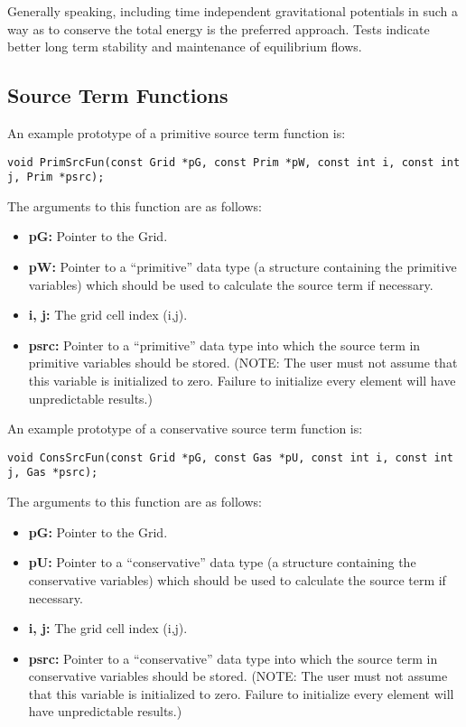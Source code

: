 Generally speaking, including time independent gravitational
potentials in such a way as to conserve the total energy is the
preferred approach.  Tests indicate better long term stability and
maintenance of equilibrium flows.

\subsection{Source Term Functions}

An example prototype of a primitive source term function is:
\footnotesize
\begin{verbatim}
void PrimSrcFun(const Grid *pG, const Prim *pW, const int i, const int j, Prim *psrc);
\end{verbatim}
\normalsize
The arguments to this function are as follows:
\begin{itemize}
\item {\bf pG:} Pointer to the Grid.
\item {\bf pW:} Pointer to a ``primitive'' data type (a structure containing
the primitive variables) which should be used to calculate the source
term if necessary.
\item {\bf i, j:} The grid cell index (i,j).
\item {\bf psrc:} Pointer to a ``primitive'' data type into which the
source term in primitive variables should be stored.  (NOTE: The user
must not assume that this variable is initialized to zero.  Failure to
initialize every element will have unpredictable results.)
\end{itemize}


\noindent
An example prototype of a conservative source term function is:
\footnotesize
\begin{verbatim}
void ConsSrcFun(const Grid *pG, const Gas *pU, const int i, const int j, Gas *psrc);
\end{verbatim}
\normalsize
The arguments to this function are as follows:
\begin{itemize}
\item {\bf pG:} Pointer to the Grid.
\item {\bf pU:} Pointer to a ``conservative'' data type (a structure containing
the conservative variables) which should be used to calculate the source
term if necessary.
\item {\bf i, j:} The grid cell index (i,j).
\item {\bf psrc:} Pointer to a ``conservative'' data type into which the
source term in conservative variables should be stored.  (NOTE: The user
must not assume that this variable is initialized to zero.  Failure to
initialize every element will have unpredictable results.)
\end{itemize}



